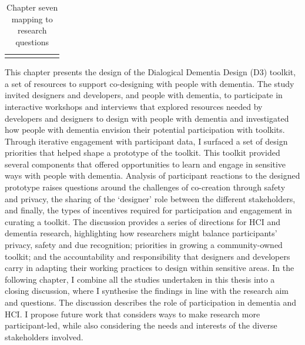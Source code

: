 \begin{table}[htp]
\begin{tabular}{p{0.15\linewidth} | p{0.8\linewidth}}
\begin{itemize}
      \end{itemize}
    \\ 
    
    \end{tabular}
    \caption{Chapter seven mapping to research questions}
    \label{chapterSevenRQ}
\end{table}

\pagebreak

This chapter presents the design of the Dialogical Dementia Design (D3) toolkit, a set of resources to support co-designing with people with dementia. The study invited designers and developers, and people with dementia, to participate in interactive workshops and interviews that explored resources needed by developers and designers to design with people with dementia and investigated how people with dementia envision their potential participation with toolkits. Through iterative engagement with participant data, I surfaced a set of design priorities that helped shape a prototype of the toolkit. This toolkit provided several components that offered opportunities to learn and engage in sensitive ways with people with dementia. Analysis of participant reactions to the designed prototype raises questions around the challenges of co-creation through safety and privacy, the sharing of the ‘designer’ role between the different stakeholders, and finally, the types of incentives required for participation and engagement in curating a toolkit. The discussion provides a series of directions for HCI and dementia research, highlighting how researchers might balance participants' privacy, safety and due recognition; priorities in growing a community-owned toolkit; and the accountability and responsibility that designers and developers carry in adapting their working practices to design within sensitive areas. In the following chapter, I combine all the studies undertaken in this thesis into a closing discussion, where I synthesise the findings in line with the research aim and questions. The discussion describes the role of participation in dementia and HCI. I propose future work that considers ways to make research more participant-led, while also considering the needs and interests of the diverse stakeholders involved.
